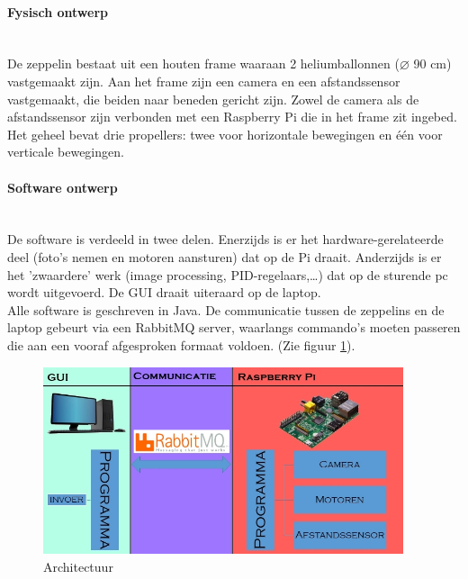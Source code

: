 \documentclass[eind]{penoverslag}
\begin{document}
\paragraph{Fysisch ontwerp}
~\\
De zeppelin bestaat uit een houten frame waaraan 2 heliumballonnen ($\diameter$ 90 cm) vastgemaakt zijn. Aan het frame zijn een camera en een afstandssensor vastgemaakt, die beiden naar beneden gericht zijn. Zowel de camera als de afstandssensor zijn verbonden met een Raspberry Pi die in het frame zit ingebed. Het geheel bevat drie propellers: twee voor horizontale bewegingen en \'{e}\'{e}n voor verticale bewegingen.


\paragraph{Software ontwerp}
~\\
De software is verdeeld in twee delen. Enerzijds is er het hardware-gerelateerde deel (foto's nemen en motoren aansturen) dat op de Pi draait. Anderzijds is er het 'zwaardere' werk (image processing, PID-regelaars,\ldots) dat op de sturende pc wordt uitgevoerd. De GUI draait uiteraard op de laptop. \\
Alle software is geschreven in Java. De communicatie tussen de zeppelins en de laptop gebeurt via een RabbitMQ server, waarlangs commando's moeten passeren die aan een vooraf afgesproken formaat voldoen. (Zie figuur \ref{schema}). \\

\begin{figure}[ht!]
\centering
\includegraphics[height=55mm]{Schema.jpg}
\caption{Architectuur}
\label{schema}
\end{figure}

\end{document}
